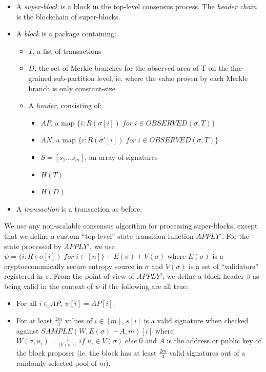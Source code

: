 \documentclass[11pt,a4paper]{report}
\theoremstyle{plain}
\theoremstyle{definition}
\theoremstyle{remark}
\begin{document}
\begin{itemize}
\item
A \emph{super-block} is a block in the top-level consensus process. The \emph{header chain} is the blockchain of super-blocks.
\item
A \emph{block} is a package containing:

    \begin{itemize}
    \item
    $T$, a list of transactions
    \item
    $D$, the set of Merkle branches for the observed area of T on the fine-grained sub-partition level, ie. where the value proven by each Merkle branch is only constant-size
    \item
    A \emph{header}, consisting of:
        \begin{itemize}
        \item
        $AP$, a map $\{i: R(\sigma[i]) \; for \; i \in OBSERVED(\sigma, T)\}$
        \item
        $AN$, a map $\{i: R(\sigma'[i]) \; for \; i \in OBSERVED(\sigma, T)\}$
        \item
        $S = [s_1 \ldots s_m]$, an array of signatures
        \item
        $H(T)$
        \item
        $H(D)$
        \end{itemize}
    \end{itemize}
\item
A \emph{transaction} is a transaction as before.
\end{itemize}

We use any non-scalable consensus algorithm for processing super-blocks, except that we define a custom ``top-level'' state transition function $APPLY'$. For the state processed by $APPLY'$, we use $\psi = \{i: R(\sigma[i]) \; for \; i \in [n]\} + E(\sigma) + V(\sigma)$ where $E(\sigma)$ is a cryptoeconomically secure entropy source in $\sigma$ and $V(\sigma)$ is a set of ``validators'' registered in $\sigma$. From the point of view of $APPLY'$, we define a block header $\beta$ as being valid in the context of $\psi$ if the following are all true:

\begin{itemize}
\item
For all $i \in AP$, $\psi[i] = AP[i]$.
\item
For at least $\frac{2m}{3}$ values of $i \in [m]$, $s[i]$ is a valid signature when checked against $SAMPLE(W, E(\sigma) + A, m)[i]$ where $W(\sigma, u_i) = \frac{1}{|V(\sigma)|} \; if \; u_i \in V(\sigma) \; else \; 0$ and $A$ is the address or public key of the block proposer (ie. the block has at least $\frac{2m}{3}$ valid signatures out of a randomly selected pool of $m$).
\end{itemize}
\end{document}
